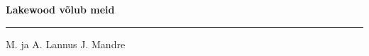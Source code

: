 \documentclass[10pt]{book}
\begin{document}
{
  \samepage
  \raggedbottom
  \raggedright
  \sloppy


  \vspace{0.2in}

  \noindent\begin{minipage}{.1\textwidth}
    \hfill\vspace{0.1in}
  \end{minipage}%
  \noindent\begin{minipage}{.8\textwidth}
    \centering
    \bfseries
    \large Lakewood v\~olub meid
  \end{minipage}%
  \noindent\begin{minipage}{.1\textwidth}
      \hfill\vspace{0.1in}
  \end{minipage}

  \nopagebreak[4]
  \vspace{0.1in}
  \nopagebreak[4]
  \hrule height 0.05ex
  \nopagebreak[4]
  \vspace{-0.05in}

  {\footnotesize M. ja A. Lannus \hfill J. Mandre }\\
  \vspace{0.01in}


  \vspace{0.01in}
  \nopagebreak[4]
  {%
\parindent 0pt
\noindent
\ifx\preLilyPondExample \undefined
\else
  \expandafter\preLilyPondExample
\fi
\def\lilypondbook{}%

\ifx\postLilyPondExample \undefined
\else
  \expandafter\postLilyPondExample
\fi
}

}
\end{document}
